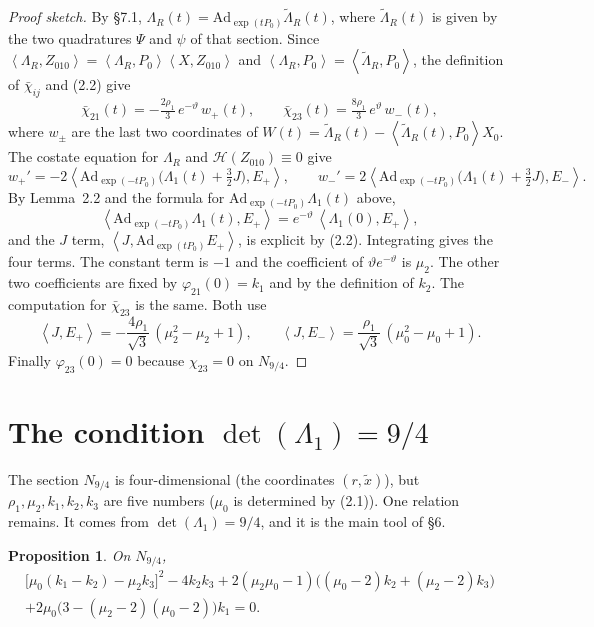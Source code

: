 \documentclass[11pt,a4paper]{article}
\theoremstyle{plain}
\newtheorem{proposition}[theorem]{Proposition}
\theoremstyle{definition}
\theoremstyle{remark}
\newcommand{\bracks}[2]{\left\langle #1,#2\right\rangle}
\newcommand{\Ad}{\mathrm{Ad}}
\renewcommand{\H}{\mathcal{H}}
\newcommand{\cl}{\bar\chi}
\begin{document}
\begin{proof}[Proof sketch]
By \S7.1, $\Lambda_R(t)=\Ad_{\exp(tP_0)}\tilde\Lambda_R(t)$, where $\tilde\Lambda_R(t)$ is
given by the two quadratures $\Psi$ and $\psi$ of that section. Since
$\bracks{\Lambda_R}{Z_{010}}=\bracks{\Lambda_R}{P_0}\bracks X{Z_{010}}$ and
$\bracks{\Lambda_R}{P_0}=\bracks{\tilde\Lambda_R}{P_0}$, the definition of $\cl_{ij}$ and (2.2)
give
\[
\cl_{21}(t)=-\tfrac{2\rho_1}{3}\,e^{-\vartheta}\,w_+(t),\qquad
\cl_{23}(t)=\tfrac{8\rho_1}{3}\,e^{\vartheta}\,w_-(t),
\]
where $w_\pm$ are the last two coordinates of
$W(t)=\tilde\Lambda_R(t)-\bracks{\tilde\Lambda_R(t)}{P_0}X_0$. The costate equation for
$\Lambda_R$ and $\H(Z_{010})\equiv0$ give
\[
w_+'=-2\bracks{\Ad_{\exp(-tP_0)}\bigl(\Lambda_1(t)+\tfrac32J\bigr)}{E_+},\qquad
w_-'=2\bracks{\Ad_{\exp(-tP_0)}\bigl(\Lambda_1(t)+\tfrac32J\bigr)}{E_-}.
\]
By Lemma~2.2 and the formula for $\Ad_{\exp(-tP_0)}\Lambda_1(t)$ above,
\[
\bracks{\Ad_{\exp(-tP_0)}\Lambda_1(t)}{E_+}=e^{-\vartheta}\,\bracks{\Lambda_1(0)}{E_+},
\]
and the $J$ term, $\bracks{J}{\Ad_{\exp(tP_0)}E_+}$, is explicit by (2.2). Integrating gives the
four terms. The constant term is $-1$ and the coefficient of $\vartheta e^{-\vartheta}$ is
$\mu_2$. The other two coefficients are fixed by $\varphi_{21}(0)=k_1$ and by the definition of
$k_2$. The computation for $\cl_{23}$ is the same. Both use
\[
\bracks J{E_+}=-\frac{4\rho_1}{\sqrt3}\,(\mu_2^2-\mu_2+1),\qquad
\bracks J{E_-}=\frac{\rho_1}{\sqrt3}\,(\mu_0^2-\mu_0+1).
\]
Finally $\varphi_{23}(0)=0$ because $\chi_{23}=0$ on $N_{9/4}$.
\end{proof}

\section{The condition \texorpdfstring{$\det(\Lambda_1)=9/4$}{det(Lambda1) = 9/4}}

The section $N_{9/4}$ is four-dimensional (the coordinates $(r,\tilde x)$), but
$\rho_1,\mu_2,k_1,k_2,k_3$ are five numbers ($\mu_0$ is determined by (2.1)). One relation
remains. It comes from $\det(\Lambda_1)=9/4$, and it is the main tool of \S6.

\begin{proposition}
On $N_{9/4}$,
\begin{multline}\tag{3.1}
\bigl[\mu_0(k_1-k_2)-\mu_2k_3\bigr]^2-4k_2k_3
+2(\mu_2\mu_0-1)\bigl((\mu_0-2)k_2+(\mu_2-2)k_3\bigr)\\
+2\mu_0\bigl(3-(\mu_2-2)(\mu_0-2)\bigr)k_1=0 .
\end{multline}
\end{proposition}
\end{document}
